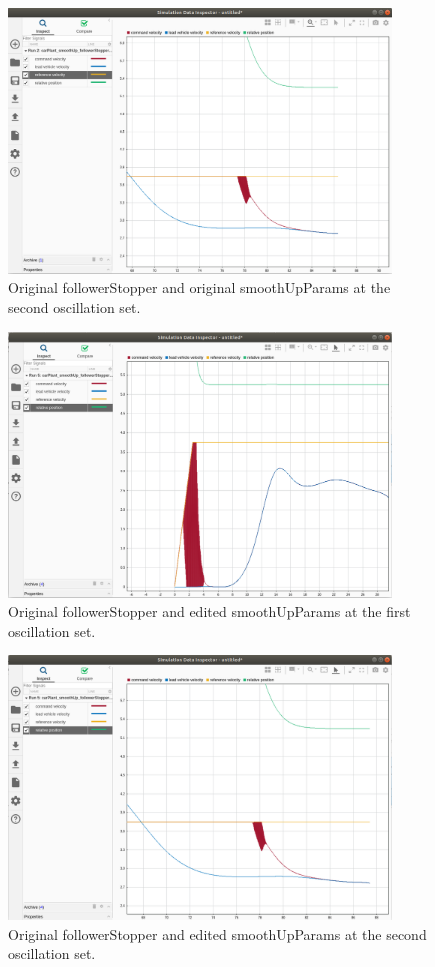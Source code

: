 \documentclass[12pt, letterpaper]{article}
\begin{document}
\begin{figure}[h]
\begin{center}
\includegraphics[width=4in]{originalFS_originalSUP_3}
\caption{Original followerStopper and original smoothUpParams at the second oscillation set.}
\label{default}
\end{center}

\end{figure}
\begin{figure}[h]
\begin{center}
\includegraphics[width=4in]{originalFS_editedSUP_2}
\caption{Original followerStopper and edited smoothUpParams at the first oscillation set.}
\label{default}
\end{center}
\end{figure}

\begin{figure}[h]
\begin{center}
\includegraphics[width=4in]{originalFS_editedSUP_3}
\caption{Original followerStopper and edited smoothUpParams at the second oscillation set.}
\label{default}
\end{center}
\end{figure}
\end{document}
